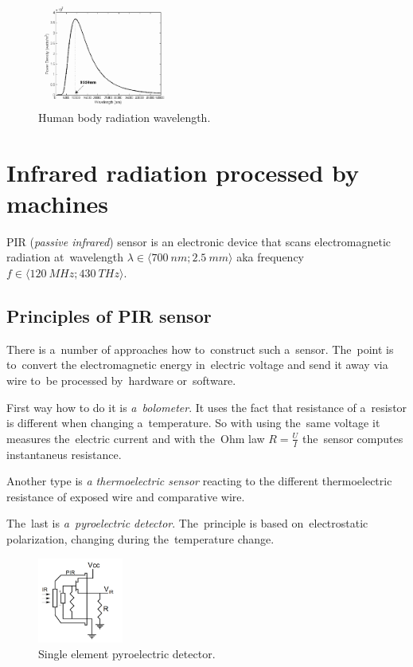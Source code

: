 \begin{figure}[h!]
\begin{center}
\includegraphics[width=0.4\textwidth]{obrazky-figures/bodyradiation.png}
\caption{Human body radiation wavelength.\cite{BodyRadiation}\label{fig:bodywavelength}}
\end{center}    
\end{figure}





\newpage
\section{Infrared radiation processed by machines}
\label{IRsensing}
PIR ({\it passive infrared}) sensor is an electronic device that scans electromagnetic
radiation at~wavelength $\lambda\in \langle 700~nm;2.5~mm \rangle$ aka frequency $f\in \langle 120~MHz;430~THz \rangle$. \cite{an2105}


\subsection*{Principles of PIR sensor}
There is a~number of approaches how to~construct such a~sensor. The~point is to~convert the electromagnetic
energy in~electric voltage and send it away via wire to~be processed by~hardware or~software.

First way how to do it is {\it a~bolometer}. It uses the fact that resistance of a~resistor is different
when changing a~temperature. So with using the~same voltage it measures the~electric current and
with the~Ohm law $R = \frac{U}{I}$ the~sensor computes instantaneus resistance.

Another type is {\it a thermoelectric sensor} reacting to the different thermoelectric resistance of
exposed wire and comparative wire.

The~last is {\it a~pyroelectric detector}. The~principle is based on~electrostatic polarization,
changing during the~temperature change. \cite{DetectorsBook}

\begin{figure}[h!]
\begin{center}
\includegraphics[width=0.25\textwidth]{obrazky-figures/pirscheme.png}
\caption{Single element pyroelectric detector.\cite{an2105}\label{fig:pir}}
\end{center}    
\end{figure}


